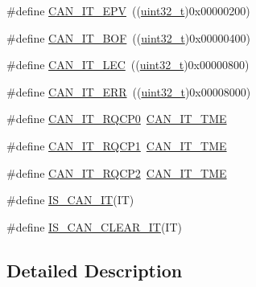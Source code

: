 \begin{DoxyCompactItemize}
\item 
\#define \hyperlink{group___c_a_n__interrupts_ga006b7b641d337a599ceac64b483e75dd}{C\+A\+N\+\_\+\+I\+T\+\_\+\+E\+PV}~((\hyperlink{_p_e___types_8h_a33594304e786b158f3fb30289278f5af}{uint32\+\_\+t})0x00000200)
\item 
\#define \hyperlink{group___c_a_n__interrupts_gad63c39e6237aa07681a1f8ce2ff9e167}{C\+A\+N\+\_\+\+I\+T\+\_\+\+B\+OF}~((\hyperlink{_p_e___types_8h_a33594304e786b158f3fb30289278f5af}{uint32\+\_\+t})0x00000400)
\item 
\#define \hyperlink{group___c_a_n__interrupts_gad670b6f001bf67f24e17d91ada50a61c}{C\+A\+N\+\_\+\+I\+T\+\_\+\+L\+EC}~((\hyperlink{_p_e___types_8h_a33594304e786b158f3fb30289278f5af}{uint32\+\_\+t})0x00000800)
\item 
\#define \hyperlink{group___c_a_n__interrupts_ga65f1781c9165a2e9b5f77f1ed3990741}{C\+A\+N\+\_\+\+I\+T\+\_\+\+E\+RR}~((\hyperlink{_p_e___types_8h_a33594304e786b158f3fb30289278f5af}{uint32\+\_\+t})0x00008000)
\item 
\#define \hyperlink{group___c_a_n__interrupts_ga0c57058d6d14b2baa24a4895975b1371}{C\+A\+N\+\_\+\+I\+T\+\_\+\+R\+Q\+C\+P0}~\hyperlink{openmotestm_2library_2inc_2stm32f10x__can_8h_a619e36230fa2eb089a7c1936b5004eb9}{C\+A\+N\+\_\+\+I\+T\+\_\+\+T\+ME}
\item 
\#define \hyperlink{group___c_a_n__interrupts_ga42e5c8e89e0f06f3250916fcfb21dc22}{C\+A\+N\+\_\+\+I\+T\+\_\+\+R\+Q\+C\+P1}~\hyperlink{openmotestm_2library_2inc_2stm32f10x__can_8h_a619e36230fa2eb089a7c1936b5004eb9}{C\+A\+N\+\_\+\+I\+T\+\_\+\+T\+ME}
\item 
\#define \hyperlink{group___c_a_n__interrupts_gacc634c3e29cdc9622081021dcda3127b}{C\+A\+N\+\_\+\+I\+T\+\_\+\+R\+Q\+C\+P2}~\hyperlink{openmotestm_2library_2inc_2stm32f10x__can_8h_a619e36230fa2eb089a7c1936b5004eb9}{C\+A\+N\+\_\+\+I\+T\+\_\+\+T\+ME}
\item 
\#define \hyperlink{group___c_a_n__interrupts_ga062e922c41d2729fc37257167de93302}{I\+S\+\_\+\+C\+A\+N\+\_\+\+IT}(IT)            
\item 
\#define \hyperlink{group___c_a_n__interrupts_ga8b6e5fd6ddfe0141925f1e22cfbe7b85}{I\+S\+\_\+\+C\+A\+N\+\_\+\+C\+L\+E\+A\+R\+\_\+\+IT}(IT)
\end{DoxyCompactItemize}


\subsection{Detailed Description}


